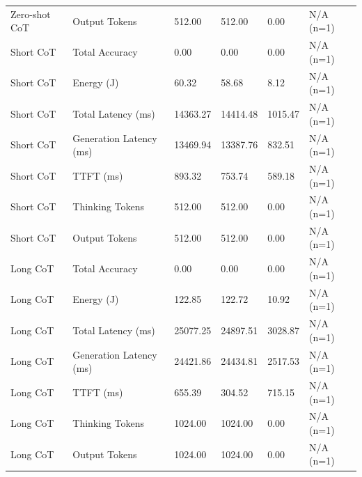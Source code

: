 \begin{table}
\begin{tabular}{llllll}
Zero-shot CoT & Output Tokens & 512.00 & 512.00 & 0.00 & N/A (n=1) \\
Short CoT & Total Accuracy & 0.00 & 0.00 & 0.00 & N/A (n=1) \\
Short CoT & Energy (J) & 60.32 & 58.68 & 8.12 & N/A (n=1) \\
Short CoT & Total Latency (ms) & 14363.27 & 14414.48 & 1015.47 & N/A (n=1) \\
Short CoT & Generation Latency (ms) & 13469.94 & 13387.76 & 832.51 & N/A (n=1) \\
Short CoT & TTFT (ms) & 893.32 & 753.74 & 589.18 & N/A (n=1) \\
Short CoT & Thinking Tokens & 512.00 & 512.00 & 0.00 & N/A (n=1) \\
Short CoT & Output Tokens & 512.00 & 512.00 & 0.00 & N/A (n=1) \\
Long CoT & Total Accuracy & 0.00 & 0.00 & 0.00 & N/A (n=1) \\
Long CoT & Energy (J) & 122.85 & 122.72 & 10.92 & N/A (n=1) \\
Long CoT & Total Latency (ms) & 25077.25 & 24897.51 & 3028.87 & N/A (n=1) \\
Long CoT & Generation Latency (ms) & 24421.86 & 24434.81 & 2517.53 & N/A (n=1) \\
Long CoT & TTFT (ms) & 655.39 & 304.52 & 715.15 & N/A (n=1) \\
Long CoT & Thinking Tokens & 1024.00 & 1024.00 & 0.00 & N/A (n=1) \\
Long CoT & Output Tokens & 1024.00 & 1024.00 & 0.00 & N/A (n=1) \\
\bottomrule
\end{tabular}
\end{table}
